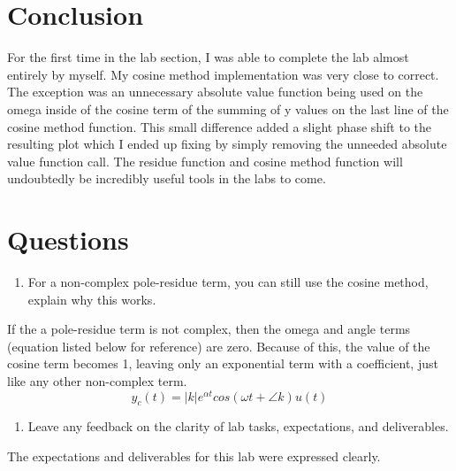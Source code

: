 \documentclass[12pt]{article}
\begin{document}
\newpage
\section*{Conclusion}
\par For the first time in the lab section, I was able to complete the lab almost entirely by myself. My cosine method implementation was very close to correct. The exception was an unnecessary absolute value function being used on the omega inside of the cosine term of the summing of y values on the last line of the cosine method function. This small difference added a slight phase shift to the resulting plot which I ended up fixing by simply removing the unneeded absolute value function call. The residue function and cosine method function will undoubtedly be incredibly useful tools in the labs to come.

\newpage
\section*{Questions}

\begin{enumerate}
    \item For a non-complex pole-residue term, you can still use the cosine method, explain why this works.
\end{enumerate}
    \par If the a pole-residue term is not complex, then the omega and angle terms (equation listed below for reference) are zero. Because of this, the value of the cosine term becomes 1, leaving only an exponential term with a coefficient, just like any other non-complex term.
    $$ y_c(t) = |k|e^{\alpha t}cos(\omega t+\angle k)u(t) $$
    
\begin{enumerate}[resume]
    \item Leave any feedback on the clarity of lab tasks, expectations, and deliverables.
\end{enumerate}
    \par The expectations and deliverables for this lab were expressed clearly.
    
\end{document}
